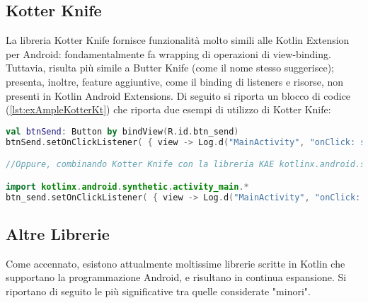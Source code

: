 \subsection{Kotter Knife}
La libreria Kotter Knife \cite{kotterKnife} fornisce funzionalità molto simili alle Kotlin Extension per Android: fondamentalmente fa wrapping di operazioni di view-binding. Tuttavia, risulta più simile a Butter Knife (come il nome stesso suggerisce); presenta, inoltre, feature aggiuntive, come il binding di listeners e risorse, non presenti in Kotlin Android Extensions. Di seguito si riporta un blocco di codice (\ref{lst:exAmpleKotterKt}) che riporta due esempi di utilizzo di Kotter Knife:\\

\begin{lstlisting}[caption={Due esempi di uso di Kotter Knife con Kotlin}, captionpos=b, label={lst:exAmpleKotterKt}, language=Kotlin]
val btnSend: Button by bindView(R.id.btn_send)
btnSend.setOnClickListener( { view -> Log.d("MainActivity", "onClick: send") } )

//Oppure, combinando Kotter Knife con la libreria KAE kotlinx.android.synthetic

import kotlinx.android.synthetic.activity_main.*
btn_send.setOnClickListener( { view -> Log.d("MainActivity", "onClick: send") } )
\end{lstlisting}

\subsection{Altre Librerie}
Come accennato, esistono attualmente moltissime librerie scritte in Kotlin che supportano la programmazione Android, e risultano in continua espansione. Si riportano di seguito le più significative tra quelle considerate "minori".\\

